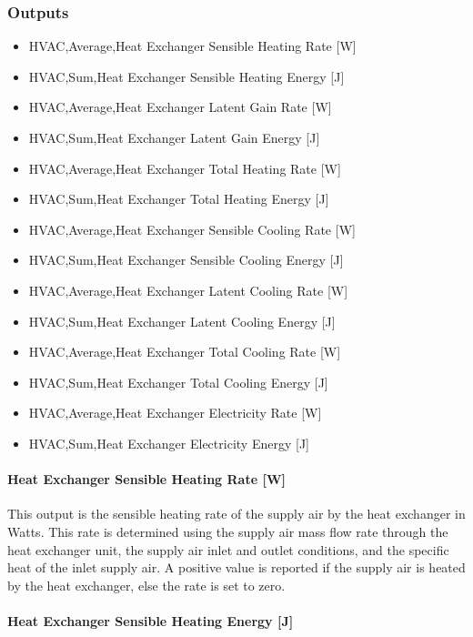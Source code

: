 \subsubsection{Outputs}\label{outputs-014}

\begin{itemize}
\item
  HVAC,Average,Heat Exchanger Sensible Heating Rate {[}W{]}
\item
  HVAC,Sum,Heat Exchanger Sensible Heating Energy {[}J{]}
\item
  HVAC,Average,Heat Exchanger Latent Gain Rate {[}W{]}
\item
  HVAC,Sum,Heat Exchanger Latent Gain Energy {[}J{]}
\item
  HVAC,Average,Heat Exchanger Total Heating Rate {[}W{]}
\item
  HVAC,Sum,Heat Exchanger Total Heating Energy {[}J{]}
\item
  HVAC,Average,Heat Exchanger Sensible Cooling Rate {[}W{]}
\item
  HVAC,Sum,Heat Exchanger Sensible Cooling Energy {[}J{]}
\item
  HVAC,Average,Heat Exchanger Latent Cooling Rate {[}W{]}
\item
  HVAC,Sum,Heat Exchanger Latent Cooling Energy {[}J{]}
\item
  HVAC,Average,Heat Exchanger Total Cooling Rate {[}W{]}
\item
  HVAC,Sum,Heat Exchanger Total Cooling Energy {[}J{]}
\item
  HVAC,Average,Heat Exchanger Electricity Rate {[}W{]}
\item
  HVAC,Sum,Heat Exchanger Electricity Energy {[}J{]}
\end{itemize}

\paragraph{Heat Exchanger Sensible Heating Rate {[}W{]}}\label{heat-exchanger-sensible-heating-rate-w}

This output is the sensible heating rate of the supply air by the heat exchanger in Watts. This rate is determined using the supply air mass flow rate through the heat exchanger unit, the supply air inlet and outlet conditions, and the specific heat of the inlet supply air. A positive value is reported if the supply air is heated by the heat exchanger, else the rate is set to zero.

\paragraph{Heat Exchanger Sensible Heating Energy {[}J{]}}\label{heat-exchanger-sensible-heating-energy-j}

